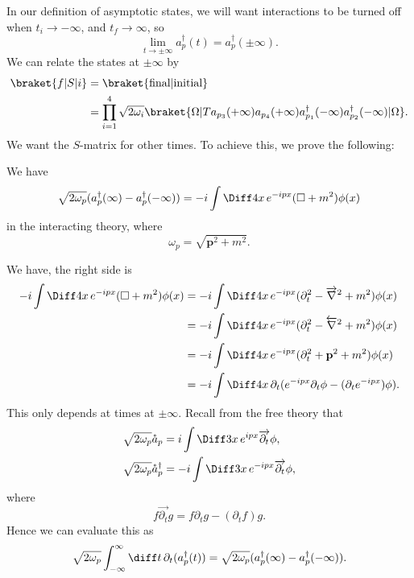 \documentclass[12pt]{article}
\begin{document}
In our definition of asymptotic states, we will want interactions to be turned off when $t_i \to -\infty$, and $t_f \to \infty$, so
\[
\lim_{t \to \pm \infty} a_p^{\dagger} (t) = a_p^{\dagger}(\pm \infty).
\]
We can relate the states at $\pm \infty$ by
\begin{align*}
	\braket{f|S|i} &= \braket{\text{final}|\text{initial}} \\
		       &= \prod_{i = 1}^4 \sqrt{2 \omega_i} \braket{\Omega | T a_{p_3}(+\infty) a_{p_4}(+\infty) a_{p_1}^{\dagger}(-\infty) a_{p_2}^{\dagger}(-\infty)| \Omega}.
\end{align*}
We want the $S$-matrix for other times. To achieve this, we prove the following:

\begin{proposition}
	We have
	\[
		\sqrt{2 \omega_p} (a_p^{\dagger}(\infty) - a_p^{\dagger}(-\infty)) = - i \int \Diff 4 x \, e^{-ipx} (\square + m^2) \phi(x)
	\]
	in the interacting theory, where
	\[
		\omega_p = \sqrt{\mathbf{p}^2 + m^2}.
	\]
\end{proposition}

\begin{proofbox}
	We have, the right side is
	\begin{align*}
		-i \int \Diff 4 x \, e^{-ipx}(\square + m^2)\phi(x) &= - i \int \Diff4 x \, e^{-ipx}(\partial_t^2 - \overrightarrow{\nabla}^2 + m^2) \phi(x) \\
								 &= - i \int \Diff 4 x \, e^{-ipx} (\partial_t^2 - \overleftarrow{\nabla}^2 + m^2) \phi(x) \\
								 &= - i \int \Diff 4 x \, e^{-ipx} (\partial_t^2 + \mathbf{p}^2 + m^2) \phi(x) \\
								 &= -i \int \Diff 4 x \, \partial_t(e^{-ipx} \partial_t \phi - (\partial_t e^{-ipx})\phi ).
	\end{align*}
	This only depends at times at $\pm \infty$. Recall from the free theory that
	\begin{align*}
		\sqrt{2 \omega_p} \mathring a_p &= i \int \Diff 3  x \, e^{ipx} \overrightarrow{\partial_t} \phi, \\
	\sqrt{2 \omega_p} \mathring{a}_p^{\dagger} &= -i \int \Diff 3 x \, e^{-ipx} \overrightarrow{\partial_t} \phi,
	\end{align*}
	where
	\[
		f \overrightarrow{\partial_t} g = f \partial_t g - (\partial_t f)g.
	\]
	Hence we can evaluate this as
	\[
		\sqrt{2 \omega_p} \int_{-\infty}^{\infty} \diff t \, \partial_t (a_p^{\dagger}(t)) = \sqrt{2\omega_p} (a_p^{\dagger}(\infty) - a_p^{\dagger}(-\infty)).
\]
\end{proofbox}
\end{document}

